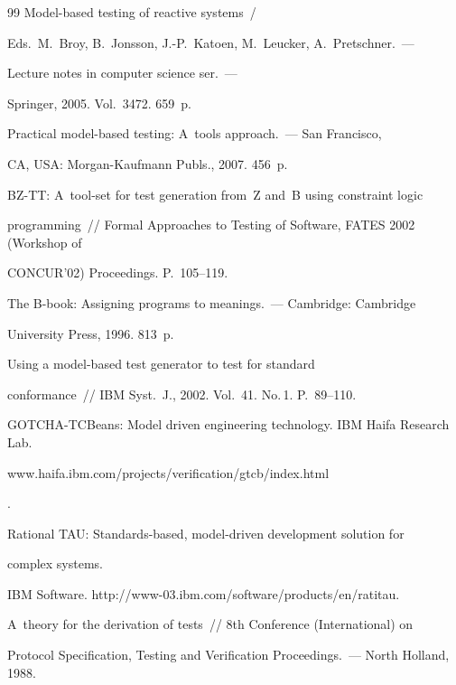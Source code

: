 {{\begin{thebibliography}{99}
Model-based testing of reactive systems~/


Eds.\ M.~Broy, B.~Jonsson, J.-P.~Katoen, M.~Leucker, A.~Pretschner.~---


Lecture notes in computer science ser.~---


Springer, 2005. Vol.~3472. 659~p.




 Practical model-based testing: A~tools approach.~--- San Francisco,


CA, USA: Morgan-Kaufmann Publs., 2007. 456~p.




 BZ-TT: A~tool-set for test generation from~Z and~B using constraint logic


programming~/\!\!/  Formal Approaches to Testing of Software, FATES 2002 (Workshop of


CONCUR'02) Proceedings. P.~105--119.




 The B-book: Assigning programs to meanings.~--- Cambridge: Cambridge


University Press, 1996. 813~p.




 Using a model-based test generator to test for standard


conformance~/\!\!/ IBM Syst.~J., 2002. Vol.~41. No.\,1. P.~89--110.




GOTCHA-TCBeans: Model driven engineering technology. IBM Haifa Research Lab. {\sf


www.haifa.ibm.com/projects/verification/gtcb/index.html}.




Rational TAU: Standards-based, model-driven development solution for


complex systems.


IBM Software. {\sf http://www-03.ibm.com/software/products/en/ratitau}.




 A~theory for the derivation of tests~/\!\!/ 8th Conference (International) on


Protocol Specification, Testing and Verification Proceedings.~--- North Holland, 1988.



\end{thebibliography}}}
